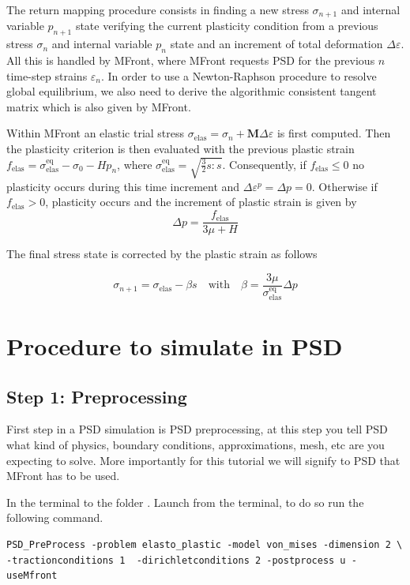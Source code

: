 The return mapping procedure consists in finding a new stress
\(\sigma_{n+1}\) and internal variable \(p_{n+1}\) state verifying the
current plasticity condition from a previous stress \(\sigma_n\) and
internal variable \(p_{n}\) state and an increment of total deformation
\(\Delta \varepsilon\). All this is handled by MFront, where MFront
requests PSD for the previous \(n\) time-step strains \(\varepsilon_n\).
In order to use a Newton-Raphson procedure to resolve global
equilibrium, we also need to derive the algorithmic consistent tangent
matrix which is also given by MFront.

Within MFront an elastic trial stress
\(\sigma_{\text{elas}} = \sigma_{n} + \mathbf{M}\Delta \varepsilon\) is
first computed. Then the plasticity criterion is then evaluated with the
previous plastic strain
\(f_{\text{elas}}=\sigma_{\text{elas}}^{\text{eq}} - \sigma_0 - Hp_n\),
where \(\sigma_{\text{elas}}^{\text{eq}}=\sqrt{\frac{3}{2}s:s}\).
Consequently, if \(f_{\text{elas}} \le 0\) no plasticity occurs during
this time increment and \(\Delta \varepsilon^p = \Delta p =0\).
Otherwise if \(f_{\text{elas}} > 0\), plasticity occurs and the
increment of plastic strain is given by
\[\Delta p = \frac{f_{\text{elas}}}{3\mu + H}\]

The final stress state is corrected by the plastic strain as follows

\[\sigma_{n+1} = \sigma_{\text{elas}} - \beta s \quad \text{with} \quad \beta=\frac{3\mu}{\sigma_{\text{elas}}^{\text{eq}}}\Delta p\]

\section{Procedure to simulate in PSD}

\subsection{Step 1: Preprocessing}

First step in a PSD simulation is PSD preprocessing, at this step you
tell PSD what kind of physics, boundary conditions, approximations,
mesh, etc are you expecting to solve. More importantly for this tutorial
we will signify to PSD that MFront has to be used.

In the terminal  to the folder
. Launch 
from the terminal, to do so run the following command.

\begin{lstlisting}[style=BashInputStyle]
PSD_PreProcess -problem elasto_plastic -model von_mises -dimension 2 \
-tractionconditions 1  -dirichletconditions 2 -postprocess u -useMfront
\end{lstlisting}

